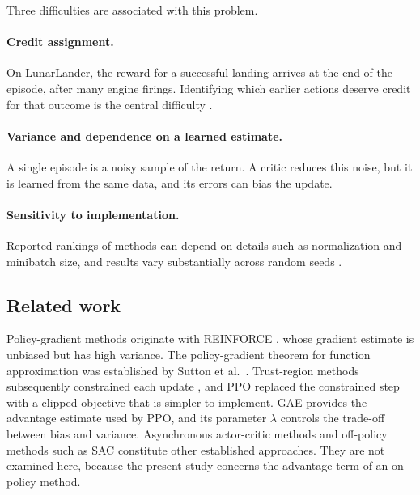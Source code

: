 \documentclass[11pt,a4paper]{article}
\begin{document}
Three difficulties are associated with this problem.

\paragraph{Credit assignment.} On LunarLander, the reward for a successful landing arrives at the end of the episode, after many engine firings. Identifying which earlier actions deserve credit for that outcome is the central difficulty \cite{pignatelli2024credit}.

\paragraph{Variance and dependence on a learned estimate.} A single episode is a noisy sample of the return. A critic reduces this noise, but it is learned from the same data, and its errors can bias the update.

\paragraph{Sensitivity to implementation.} Reported rankings of methods can depend on details such as normalization and minibatch size, and results vary substantially across random seeds \cite{engstrom2020implementation,henderson2018matters}.

\subsection{Related work}
\label{sec:related}

Policy-gradient methods originate with REINFORCE \cite{williams1992reinforce}, whose gradient estimate is unbiased but has high variance. The policy-gradient theorem for function approximation was established by Sutton et al.\ \cite{sutton1999policygradient}. Trust-region methods subsequently constrained each update \cite{schulman2015trpo}, and PPO \cite{schulman2017ppo} replaced the constrained step with a clipped objective that is simpler to implement. GAE \cite{schulman2016gae} provides the advantage estimate used by PPO, and its parameter $\lambda$ controls the trade-off between bias and variance. Asynchronous actor-critic methods \cite{mnih2016a3c} and off-policy methods such as SAC \cite{haarnoja2018sac} constitute other established approaches. They are not examined here, because the present study concerns the advantage term of an on-policy method.
\end{document}
